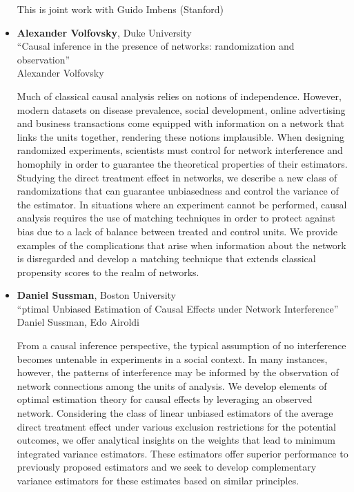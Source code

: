 \begin{itemize}
This is joint work with Guido Imbens (Stanford)

\item \textbf{Alexander Volfovsky}, Duke University \\
``Causal inference in the presence of networks: randomization and observation'' \\
Alexander Volfovsky


Much of classical causal analysis relies on notions of independence. However, modern datasets on disease prevalence, social development, online advertising and business transactions come equipped with information on a network that links the units together, rendering these notions implausible. When designing randomized experiments, scientists must control for network interference and homophily in order to guarantee the theoretical properties of their estimators. Studying the direct treatment effect in networks, we describe a new class of randomizations that can guarantee unbiasedness and control the variance of the estimator. In situations where an experiment cannot be performed, causal analysis requires the use of matching techniques in order to protect against bias due to a lack of balance between treated and control units. We provide examples of the complications that arise when information about the network is disregarded and develop a matching technique that extends classical propensity scores to the realm of networks.

\item \textbf{Daniel Sussman}, Boston University \\
``ptimal Unbiased Estimation of Causal Effects under Network Interference'' \\
Daniel Sussman, Edo Airoldi


From a causal inference perspective, the typical assumption of no interference becomes untenable in experiments in a social context. In many instances, however, the patterns of interference may be informed by the observation of network connections among the units of analysis. We develop elements of optimal estimation theory for causal effects by leveraging an observed network. Considering the class of linear unbiased estimators of the average direct treatment effect under various exclusion restrictions for the potential outcomes, we offer analytical insights on the weights that lead to minimum integrated variance estimators. These estimators offer superior performance to previously proposed estimators and we seek to develop complementary variance estimators for these estimates based on similar principles.

\end{itemize}

